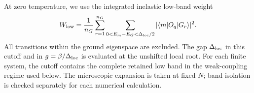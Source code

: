 At zero temperature, we use the integrated inelastic low-band weight
\begin{equation}
 W_{\mathrm{low}}=\frac{1}{n_G}\sum_{r=1}^{n_G}
 \sum_{0<E_m-E_G<\Delta_{\mathrm{loc}}/2}|\langle m|O_q|G_r\rangle|^2.
 \label{eq:rank-weight}
\end{equation}
All transitions within the ground eigenspace are excluded.
The gap $\Delta_{\mathrm{loc}}$ in this cutoff and in $g=\beta/\Delta_{\mathrm{loc}}$ is evaluated at the
unshifted local root. For each finite system, the cutoff contains the
complete retained low band in the weak-coupling regime used below.
The microscopic expansion is taken at fixed $N$; band isolation is
checked separately for each numerical calculation.
